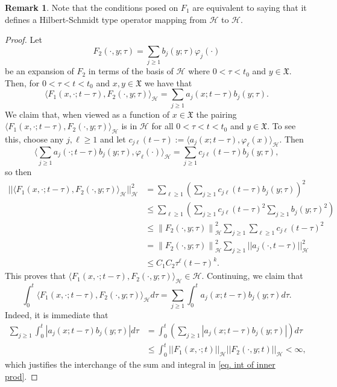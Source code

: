 \documentclass[11pt,reqno]{amsart}
\theoremstyle{remark}
\theoremstyle{definition}
\newtheorem{remark}{Remark}
\numberwithin{theorem}{section} \numberwithin{equation}{section}
\newcommand{\X}{\mathfrak{X}}
\begin{document}
\begin{remark}
Note that the conditions posed on $F_1$ are equivalent to saying that it defines a Hilbert-Schmidt
type operator mapping from $\mathcal{H}$ to $\mathcal{H}$.
\end{remark}

\begin{proof} Let
$$
F_2(\cdot, y;\tau)=\sum_{j\geq 1} b_j(y;\tau)\varphi_j(\cdot)
$$
be an expansion of $F_2$ in terms of the basis of $\mathcal{H}$ where $0<\tau<t_0$ and $y\in\X$. Then, for $0<\tau<t<t_0$ and $x,y\in\X$ we have that
  $$
  \langle F_1(x,\cdot;t-\tau),F_2(\cdot,y;\tau)  \rangle_{\mathcal{H}}=\sum_{j\geq 1}a_j(x;t-\tau)b_j(y;\tau).
  $$
  We claim that, when viewed as a function of $x\in\X$ the pairing $\langle F_1(x,\cdot;t-\tau),F_2(\cdot,y;\tau)  \rangle_{\mathcal{H}}$
  is in $\mathcal{H}$ for all $0<\tau<t<t_0$ and $y\in\X$.
To see this, choose any $j, \ell\geq 1$ and let $c_{j\ell}(t-\tau):=\langle a_j(x;t-\tau),\varphi_\ell(x)  \rangle_{\mathcal{H}}$. Then
$$
 \langle \sum_{j\geq 1}a_j(\cdot;t-\tau)b_j(y;\tau) , \varphi_\ell(\cdot)  \rangle_{\mathcal{H}} = \sum_{j\geq 1} c_{j\ell}(t-\tau)b_j(y;\tau),
$$
so then
\begin{align*}
|| \langle F_1(x,\cdot;t-\tau),F_2(\cdot,y;\tau)  \rangle_{\mathcal{H}}||_{\mathcal{H}}^2 &=\sum_{\ell\geq 1}\left( \sum_{j\geq 1} c_{j\ell}(t-\tau)b_j(y;\tau) \right)^2 \\&\leq \sum_{\ell\geq 1} \left( \sum_{j\geq 1} c_{j\ell}(t-\tau)^2 \sum_{j\geq 1}b_j(y;\tau)^2 \right)\\&\leq \left\|F_{2}(\cdot, y;\tau)\right\|_{\mathcal{H}}^2 \sum_{j\geq 1}  \sum_{\ell\geq 1} c_{j\ell}(t-\tau)^2\\& = \left\|F_{2}(\cdot, y;\tau)\right\|_{\mathcal{H}}^2  \sum_{j\geq 1} ||a_j(\cdot,t-\tau)||^2_{\mathcal{H}}\\&\leq C_1C_2 \tau^\ell (t-\tau)^k.
\end{align*}
This proves that $\langle F_1(x,\cdot;t-\tau),F_2(\cdot,y;\tau)  \rangle_{\mathcal{H}}\in \mathcal{H}$.
Continuing, we claim that
\begin{equation}\label{eq. int of inner prod}
\int_0^t
\langle F_1(x,\cdot;t-\tau),F_2(\cdot,y;\tau)  \rangle_{\mathcal{H}} d\tau = \sum_{j\geq 1} \int_0^t a_j(x;t-\tau)b_j(y;\tau)d\tau.
\end{equation}
Indeed, it is immediate that
\begin{align*}
\sum_{j\geq 1} \int_0^t | a_j(x;t-\tau)b_j(y;\tau)| d\tau &=\int_0^t \left(\sum_{j\geq 1}| a_j(x;t-\tau)b_j(y;\tau)|\right) d\tau \\&\leq \int_0^t  ||F_1(x, \cdot;t)||_{\mathcal{H}} ||F_2(\cdot,y;t)||_{\mathcal{H}} <\infty,
\end{align*}
which justifies the interchange of the sum and integral in \eqref{eq. int of inner prod}.


\end{proof}
\end{document}
